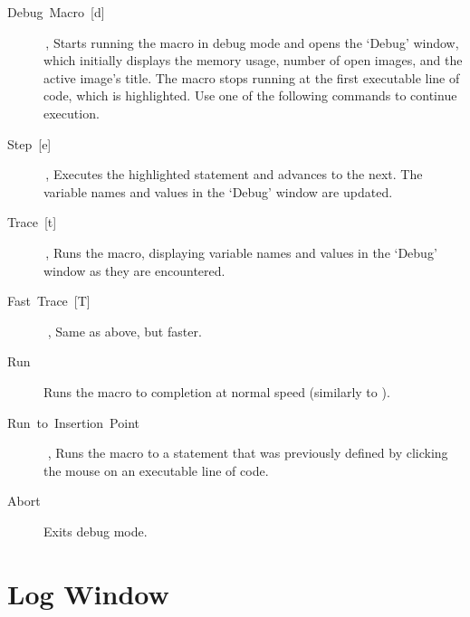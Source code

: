 \begin{description}
\begin{description}
\item [{\textsf{Debug\ Macro\ {[}d{]}}}] \,,
Starts running the macro in debug mode and opens the `Debug' window,
which initially displays the memory usage, number of open images,
and the active image's title. The macro stops running at the first
executable line of code, which is highlighted. Use one of the following
commands to continue execution.
\item [{\textsf{Step\ {[}e{]}}}] \,,
Executes the highlighted statement and advances to the next. The variable
names and values in the `Debug' window are updated.
\item [{\textsf{Trace\ {[}t{]}}}] \,,
Runs the macro, displaying variable names and values in the `Debug'
window as they are encountered.
\item [{\textsf{Fast\ Trace\ {[}T{]}}}] \,\,,
Same as above, but faster.
\item [{\textsf{Run}}] Runs the macro to completion at normal speed (similarly
to \textsf{}).
\item [{\textsf{Run\ to\ Insertion\ Point}}] \,\,,
Runs the macro to a statement that was previously defined by clicking
the mouse on an executable line of code. 
\item [{\textsf{Abort}}] Exits debug mode.
\end{description}
\end{description}



\section{Log Window\label{sec:Log-Window}}

